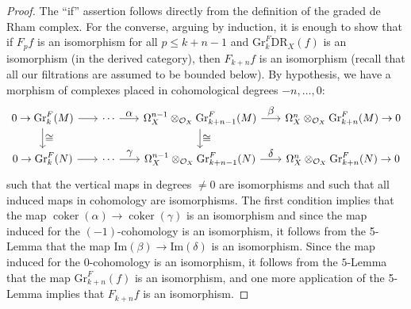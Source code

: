 \documentclass[11pt]{article}
\numberwithin{equation}{section}
\let\ra\raightarrow
\let\ra\rightarrow
\let\ts\textstyle
\theoremstyle{plain}
\theoremstyle{definition}
\newcommand\cO{\mathcal{O}}
\newcommand\cO{\mathcal{O}}
\newcommand\gr{\mathrm{Gr}}
\newcommand\DR{\mathrm{DR}}
\DeclareMathOperator{\coker}{coker}
\begin{document}
\begin{proof}
The ``if'' assertion follows directly from the definition of the graded de Rham complex. For the converse, arguing by induction, it is enough to show that if $F_pf$ is an isomorphism
for all $p\leq k+n-1$ and $\gr^F_{k}\DR_X(f)$ is an isomorphism (in the derived category), then $F_{k+n}f$ is an isomorphism
(recall that all our filtrations are assumed to be bounded below).
By hypothesis, we have a morphism of complexes placed in cohomological degrees $-n,\ldots,0$:
\[
\begin{tikzcd}[column sep=scriptsize]
0\ra \gr^F_k(M) \arrow{r}\arrow{d}{\ts\cong} & \cdots \arrow[r, "\ts\alpha"] & \Omega^{n-1}_X\otimes_{\cO_X}\gr_{k+n-1}^F(M) \arrow[r, "\ts\beta"]\arrow{d}{\ts\cong} & \Omega^n_X\otimes_{\cO_X} \gr^F_{k+n}(M)\ra 0 \\
0\ra \gr^F_k(N) \arrow{r} & \cdots \arrow[r, "\ts\gamma"] & \Omega^{n-1}_X\otimes_{\cO_X} \gr^F_{k+n-1}(N) \arrow[r, "\ts\delta"] & \Omega^n_X\otimes_{\cO_X} \gr^F_{k+n}(N) \ra 0
\end{tikzcd}
\]
such that the vertical maps in degrees $\neq 0$ are isomorphisms and such that all induced maps in cohomology are isomorphisms.
The first condition implies that the map $\coker(\alpha)\to \coker(\gamma)$ is an isomorphism and since
the map induced for the $(-1)$-cohomology is an isomorphism, it follows from the 5-Lemma that the map $\mathrm{Im}(\beta)\to \mathrm{Im}(\delta)$ is an isomorphism.
Since the map induced for the $0$-cohomology is an isomorphism, it follows from the $5$-Lemma
that the map $\gr^F_{k+n}(f)$ is an isomorphism, and one more application of the 5-Lemma
implies that $F_{k+n}f$ is an isomorphism.
\end{proof}
\end{document}

